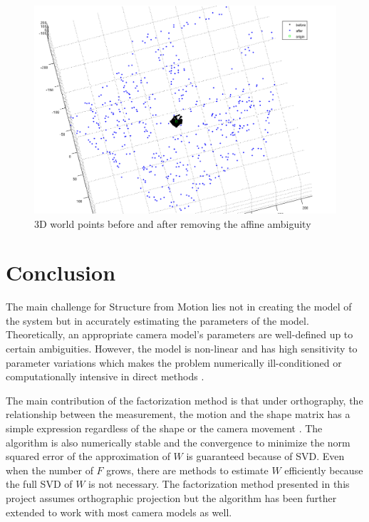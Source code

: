 \begin{figure}[!t]
  \begin{center}
  \includegraphics[scale=0.5]{3d3.png}
  \caption{3D world points before and after removing the affine ambiguity} 
  \label{fig:3D3}
  \end{center}
\end{figure}

\section{Conclusion}
\label{sec:conclusion}


The main challenge for Structure from Motion lies not in creating the
model of the system but in accurately estimating the parameters of the
model. Theoretically, an appropriate camera model's parameters are well-defined up to certain
ambiguities. However, the model is non-linear and has high sensitivity
to parameter variations which makes the problem numerically
ill-conditioned or computationally intensive in direct methods \cite{Morris}.

The main contribution of the factorization method is that under
orthography, the relationship between the measurement, the motion and
the shape matrix has a simple expression regardless of the shape or
the camera movement \cite{Tomasi}. The algorithm is also numerically stable and the convergence to minimize the
norm squared error of the approximation of $W$ is guaranteed because
of SVD. Even
when the number of $F$ grows, there are methods to estimate $W$
efficiently because the full SVD of $W$ is not necessary. 
The factorization method presented in this project assumes orthographic
projection but the algorithm has been further extended to work with
most camera models as well\cite{Morris}. 

